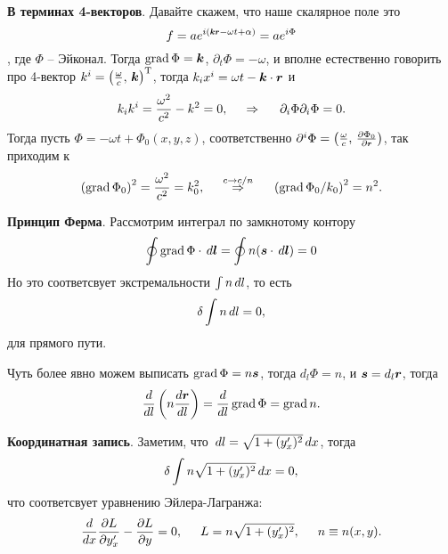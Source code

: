 \textbf{В терминах 4-векторов}. Давайте скажем, что наше скалярное поле это
$$f = a e^{i(\smallvc{k} \smallvc{r} - \omega t + \alpha)} = a e^{i \Phi}$$, где $\Phi$ -- Эйконал. Тогда $\mathop{\mathrm{grad}}\nolimits \Phi = \mbox{\boldmath $k$}$, $\partial_t \Phi = - \omega$, и вполне естественно говорить про 4-вектор $k^i = \left(\frac{\omega}{c},\, \mbox{\boldmath $k$}\right)^{\text{T}}$, тогда $k_i x^i = \omega t - \mbox{\boldmath $k$} \cdot \mbox{\boldmath $r$}$ и 
\begin{equation*}
    k_i k^i = \frac{\omega^2}{c^2} - k^2 = 0,
    \hspace{0.5cm} \Rightarrow \hspace{0.5cm}
    \partial_i \Phi \partial_i \Phi = 0.
\end{equation*}
Тогда пусть $\Phi = - \omega t + \Phi_0 (x, y, z)$, соответственно $\partial^i \Phi = \left(\frac{\omega}{c},\, \frac{\partial \Phi_0}{\partial \smallvc{r}} \right)$, так приходим к
\begin{equation*}
    \left(\mathop{\mathrm{grad}}\nolimits \Phi_0\right)^2 = \frac{\omega^2}{c^2} =  k_0^2,
    \hspace{0.5cm} \overset{c \to c/n}{\Rightarrow}  \hspace{0.5cm}
    \left(\mathop{\mathrm{grad}}\nolimits \Phi_0 / k_0\right)^2 = n^2.
\end{equation*}


\textbf{Принцип Ферма}. Рассмотрим интеграл по замкнотому контору
\begin{equation*}
    \oint \mathop{\mathrm{grad}}\nolimits \Phi \cdot \, d \mbox{\boldmath $l$} = \oint n (\mbox{\boldmath $s$} \cdot \, d \mbox{\boldmath $l$}) = 0
\end{equation*}
Но это соответсвует экстремальности $\int n \, d l$, то есть
\begin{equation*}
    \delta \int n \, d l  = 0,
\end{equation*}
для прямого пути. 

Чуть более явно можем выписать $\mathop{\mathrm{grad}}\nolimits \Phi = n \mbox{\boldmath $s$}$, тогда $d_l \Phi = n$, и $\mbox{\boldmath $s$} = d_l \mbox{\boldmath $r$}$, тогда
\begin{equation*}
    \frac{d }{d l} \left(n \frac{d \mbox{\boldmath $r$}}{d l} \right) = \frac{d }{d l}  \mathop{\mathrm{grad}}\nolimits \Phi = \mathop{\mathrm{grad}}\nolimits n.
\end{equation*}

\textbf{Координатная запись}. Заметим, что $\, d l = \sqrt{1 + (y'_x)^2} \, d x$, тогда
\begin{equation*}
    \delta \int n \sqrt{1 + (y'_x)^2} \, d x = 0,
\end{equation*}
что соответсвует уравнению Эйлера-Лагранжа:
\begin{equation*}
    \frac{d }{d x}  \frac{\partial L}{\partial y'_x} - \frac{\partial L}{\partial y} = 0,
    \hspace{5 mm}   
    L = n \sqrt{1 + (y'_x)^2}, \hspace{5 mm} 
    n \equiv n(x, y).
\end{equation*}


